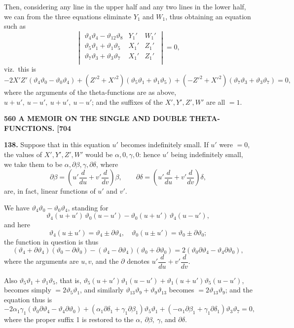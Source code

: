 \documentclass[11pt]{article}
\begin{document}
Then, considering any line in the upper half and any two lines in the lower half, we can from the three equations eliminate $Y_1$ and $W_1$, thus obtaining an equation such as
\[
\begin{vmatrix} \vartheta_4\vartheta_4 - \vartheta_{12}\vartheta_8 & Y_1' & W_1'\\ \vartheta_5\vartheta_1 + \vartheta_1\vartheta_5 & X_1' & Z_1'\\ \vartheta_7\vartheta_3 + \vartheta_3\vartheta_7 & X_1' & Z_1'\\ \end{vmatrix} = 0,
\]
viz.\ this is
\[
-2X'Z'(\vartheta_4\vartheta_0 - \vartheta_0\vartheta_4) + (Z'^2 + X'^2)(\vartheta_5\vartheta_1 + \vartheta_1\vartheta_5) + (-Z'^2 + X'^2)(\vartheta_7\vartheta_3 + \vartheta_3\vartheta_7) = 0,
\]
where the arguments of the theta-functions are as above, $u + u',\ u - u',\ u + u',\ u - u'$; and the suffixes of the $X', Y', Z', W'$ are all $= 1$.

\newpage
\noindent\textbf{560 \hfill A MEMOIR ON THE SINGLE AND DOUBLE THETA-FUNCTIONS. \hfill [704}

\medskip
\textbf{138.} Suppose that in this equation $u'$ becomes indefinitely small. If $u'$ were $=0$, the values of $X', Y', Z', W'$ would be $\alpha, 0, \gamma, 0$: hence $u'$ being indefinitely small, we take them to be $\alpha, \partial\beta, \gamma, \partial\delta$, where
\[
\partial\beta = \left(u'\frac{d}{du} + v'\frac{d}{dv}\right)\beta,\qquad \partial\delta = \left(u'\frac{d}{du} + v'\frac{d}{dv}\right)\delta,
\]
are, in fact, linear functions of $u'$ and $v'$.

\medskip
We have $\vartheta_4\vartheta_0 - \vartheta_0\vartheta_4$, standing for
\[
\vartheta_4(u + u')\,\vartheta_0(u - u') - \vartheta_0(u + u')\,\vartheta_4(u - u'),
\]
and here
\[
\vartheta_4(u \pm u') = \vartheta_4 \pm \partial\vartheta_4,\quad \vartheta_0(u \pm u') = \vartheta_0 \pm \partial\vartheta_0;
\]
the function in question is thus
\[
(\vartheta_4 + \partial\vartheta_4)(\vartheta_0 - \partial\vartheta_0) - (\vartheta_4 - \partial\vartheta_4)(\vartheta_0 + \partial\vartheta_0) = 2(\vartheta_0\partial\vartheta_4 - \vartheta_4\partial\vartheta_0),
\]
where the arguments are $u, v$, and the $\partial$ denotes $u'\dfrac{d}{du} + v'\dfrac{d}{dv}$.

\medskip
Also $\vartheta_5\vartheta_1 + \vartheta_1\vartheta_5$, that is, $\vartheta_5(u + u')\vartheta_1(u - u') + \vartheta_1(u + u')\vartheta_5(u - u')$, becomes simply $= 2\vartheta_5\vartheta_1$, and similarly $\vartheta_{13}\vartheta_9 + \vartheta_9\vartheta_{13}$ becomes $= 2\vartheta_{13}\vartheta_9$; and the equation thus is
\[
-2\alpha_1\gamma_1(\vartheta_0\partial\vartheta_4 - \vartheta_4\partial\vartheta_0) + (\alpha_1\partial\delta_1 + \gamma_1\partial\beta_1)\vartheta_5\vartheta_1 + (-\alpha_1\partial\beta_1 + \gamma_1\partial\delta_1)\vartheta_3\vartheta_7 = 0,
\]
where the proper suffix 1 is restored to the $\alpha,\ \partial\beta,\ \gamma$, and $\partial\delta$.
\end{document}
